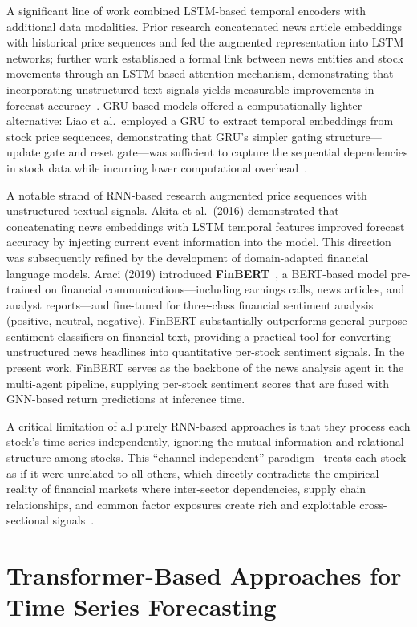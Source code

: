 \documentclass[a4paper,11pt]{report}
\begin{document}
A significant line of work combined LSTM-based temporal encoders with additional data modalities. Prior research concatenated news article embeddings with historical price sequences and fed the augmented representation into LSTM networks; further work established a formal link between news entities and stock movements through an LSTM-based attention mechanism, demonstrating that incorporating unstructured text signals yields measurable improvements in forecast accuracy~\cite{xiang2022thgnn}. GRU-based models offered a computationally lighter alternative: Liao et al.\ employed a GRU to extract temporal embeddings from stock price sequences, demonstrating that GRU's simpler gating structure---update gate and reset gate---was sufficient to capture the sequential dependencies in stock data while incurring lower computational overhead~\cite{liao2024dhstn}.

A notable strand of RNN-based research augmented price sequences with unstructured textual signals. Akita et al.\ (2016) demonstrated that concatenating news embeddings with LSTM temporal features improved forecast accuracy by injecting current event information into the model. This direction was subsequently refined by the development of domain-adapted financial language models. Araci (2019) introduced \textbf{FinBERT}~\cite{araci2019finbert}, a BERT-based model pre-trained on financial communications---including earnings calls, news articles, and analyst reports---and fine-tuned for three-class financial sentiment analysis (positive, neutral, negative). FinBERT substantially outperforms general-purpose sentiment classifiers on financial text, providing a practical tool for converting unstructured news headlines into quantitative per-stock sentiment signals. In the present work, FinBERT serves as the backbone of the news analysis agent in the multi-agent pipeline, supplying per-stock sentiment scores that are fused with GNN-based return predictions at inference time.

A critical limitation of all purely RNN-based approaches is that they process each stock's time series independently, ignoring the mutual information and relational structure among stocks. This ``channel-independent'' paradigm~\cite{liu2024itransformer} treats each stock as if it were unrelated to all others, which directly contradicts the empirical reality of financial markets where inter-sector dependencies, supply chain relationships, and common factor exposures create rich and exploitable cross-sectional signals~\cite{xiang2022thgnn}.
\section{Transformer-Based Approaches for Time Series Forecasting}
\label{sec:transformer}
\end{document}
